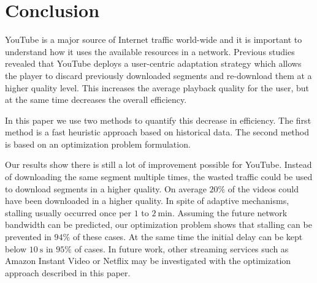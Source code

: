 
\section{Conclusion}
\label{sec:conclusion}

YouTube is a major source of Internet traffic world-wide and it is important to understand how it uses the available resources in a network.
Previous studies revealed that YouTube deploys a user-centric adaptation strategy which allows the player to discard previously downloaded segments and re-download them at a higher quality level.
This increases the average playback quality for the user, but at the same time decreases the overall efficiency.

In this paper we use two methods to quantify this decrease in efficiency.
The first method is a fast heuristic approach based on historical data.
The second method is based on an optimization problem formulation.

Our results show there is still a lot of improvement possible for YouTube. Instead of downloading the same segment multiple times, the wasted traffic could be used to download segments in a higher quality. On average $20\%$ of the videos could have been downloaded in a higher quality. In spite of adaptive mechanisms, stalling usually occurred once per $1$ to $\SI{2}{\minute}$. Assuming the future network bandwidth can be predicted, our optimization problem shows that stalling can be prevented in $94\%$ of these cases. At the same time the initial delay can be kept below $\SI{10}{\second}$ in $95\%$ of cases. In future work, other streaming services such as Amazon Instant Video or Netflix may be investigated with the optimization approach described in this paper.

